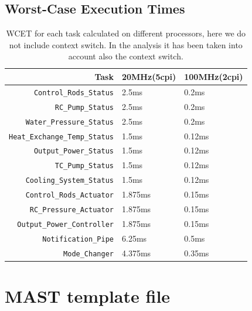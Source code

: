 \documentclass[10pt,a4paper]{report}
\begin{document}
\section{Worst-Case Execution Times}
\begin{table}[h!tb]
\centering
\begin{tabular}{|r|l l|}
\hline

\textbf{Task} & \textbf{20MHz(5cpi)} & \textbf{100MHz(2cpi)} \\
\hline

\texttt{Control\_Rods\_Status}   & 2.5ms & 0.2ms \\
\texttt{RC\_Pump\_Status}        & 2.5ms & 0.2ms \\
\texttt{Water\_Pressure\_Status} & 2.5ms & 0.2ms \\

\texttt{Heat\_Exchange\_Temp\_Status} & 1.5ms & 0.12ms \\
\texttt{Output\_Power\_Status}        & 1.5ms & 0.12ms \\
\texttt{TC\_Pump\_Status}             & 1.5ms & 0.12ms \\
\texttt{Cooling\_System\_Status}      & 1.5ms & 0.12ms \\

\texttt{Control\_Rods\_Actuator}   & 1.875ms & 0.15ms \\
\texttt{RC\_Pressure\_Actuator}    & 1.875ms & 0.15ms \\
\texttt{Output\_Power\_Controller} & 1.875ms & 0.15ms \\
\texttt{Notification\_Pipe}        & 6.25ms  & 0.5ms  \\
\texttt{Mode\_Changer}             & 4.375ms & 0.35ms \\

\hline
\end{tabular}
\caption{
    WCET for each task calculated on different processors, here we do not
    include context switch. In the analysis it has been taken into account 
    also the context switch. 
}
\label{tbl:wcet}
\end{table}

\chapter{MAST template file} \label{app:masttemplate}





\end{document}
